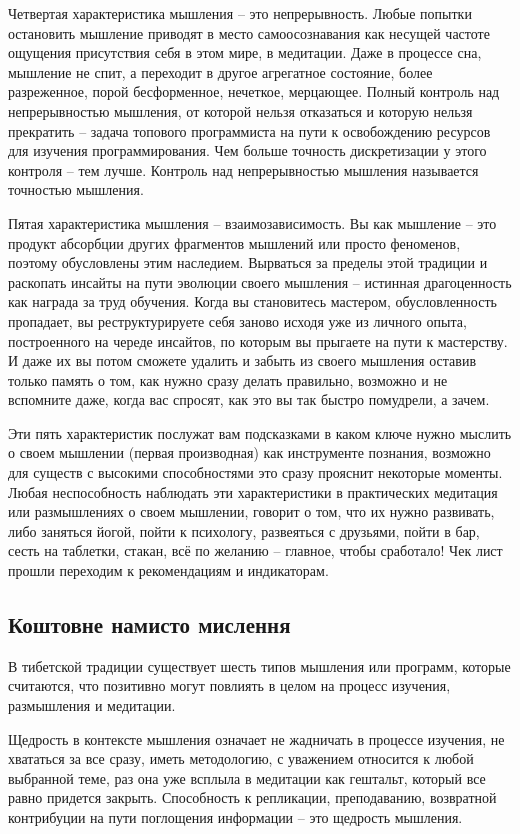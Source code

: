 Четвертая характеристика мышления – это непрерывность. Любые попытки остановить мышление приводят в место самоосознавания как несущей частоте ощущения присутствия себя в этом мире, в медитации. Даже в процессе сна, мышление не спит, а переходит в другое агрегатное состояние, более разреженное, порой бесформенное, нечеткое, мерцающее. Полный контроль над непрерывностью мышления, от которой нельзя отказаться и которую нельзя прекратить – задача топового программиста на пути к освобождению ресурсов для изучения программирования. Чем больше точность дискретизации у этого контроля – тем лучше. Контроль над непрерывностью мышления называется точностью мышления.

Пятая характеристика мышления – взаимозависимость. Вы как мышление – это продукт абсорбции других фрагментов мышлений или просто феноменов, поэтому обусловлены этим наследием. Вырваться за пределы этой традиции и раскопать инсайты на пути эволюции своего мышления – истинная драгоценность как награда за труд обучения. Когда вы становитесь мастером, обусловленность пропадает, вы реструктурируете себя заново исходя уже из личного опыта, построенного на череде инсайтов, по которым вы прыгаете на пути к мастерству. И даже их вы потом сможете удалить и забыть из своего мышления оставив только память о том, как нужно сразу делать правильно, возможно и не вспомните даже, когда вас спросят, как это вы так быстро помудрели, а зачем.

Эти пять характеристик послужат вам подсказками в каком ключе нужно мыслить о своем мышлении (первая производная) как инструменте познания, возможно для существ с высокими способностями это сразу прояснит некоторые моменты. Любая неспособность наблюдать эти характеристики в практических медитация или размышлениях о своем мышлении, говорит о том, что их нужно развивать, либо заняться йогой, пойти к психологу, развеяться с друзьями, пойти в бар, сесть на таблетки, стакан, всё по желанию – главное, чтобы сработало! Чек лист прошли переходим к рекомендациям и индикаторам.

\subsection{Коштовне намисто мислення}

В тибетской традиции существует шесть типов мышления или программ, которые считаются, что позитивно могут повлиять в целом на процесс изучения, размышления и медитации.

Щедрость в контексте мышления означает не жадничать в процессе изучения, не хвататься за все сразу, иметь методологию, с уважением относится к любой выбранной теме, раз она уже всплыла в медитации как гештальт, который все равно придется закрыть. Способность к репликации, преподаванию, возвратной контрибуции на пути поглощения информации – это щедрость мышления.

